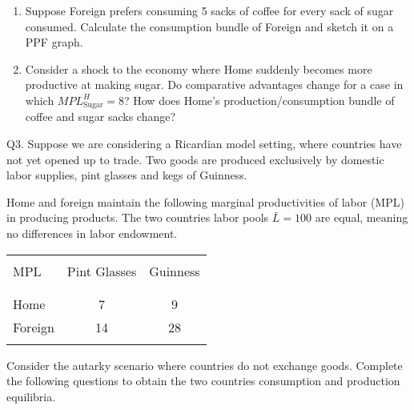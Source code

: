 \documentclass[12pt]{article}
\begin{document}
\begin{enumerate}[1)]
\bigskip

\bigskip

\bigskip

\bigskip

\bigskip  


\newpage

\item Suppose Foreign prefers consuming 5 sacks of coffee for every sack of sugar consumed. Calculate the consumption bundle of Foreign and sketch it on a PPF graph. 

\vspace{2in}

\item Consider a shock to the economy where Home suddenly becomes more productive at making sugar. Do comparative advantages change for a case in which $MPL^H_{\text{Sugar}}=8$?
How does Home's production/consumption bundle of coffee and sugar sacks change?

\vspace{4in}

\end{enumerate}

\newpage


\noindent Q3. Suppose we are considering a Ricardian model setting, where countries have not yet opened up to trade.
Two goods are produced exclusively by domestic labor supplies, pint glasses and kegs of Guinness. 

\noindent Home and foreign maintain the following marginal productivities of labor (MPL) in producing products. The two countries labor pools $\bar{L}=100$ are equal, meaning no differences in labor endowment. 

\begin{table}[!h]
	\centering
	\begin{tabular}[t]{l c c }
		\hline
		&&\\
		MPL & Pint Glasses & Guinness  \\
		&&\\
		\hline
		&&\\
		Home & 7 & 9  \\
		Foreign & 14 & 28 \\
		&&\\
		\hline
	\end{tabular}
\end{table}



Consider the autarky scenario where countries do not exchange goods. Complete the following questions to obtain the two countries consumption and production equilibria. 
\end{document}
